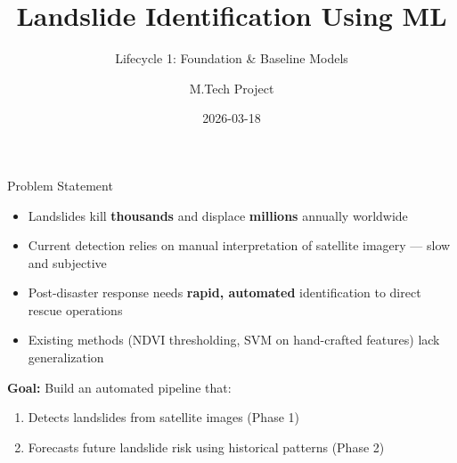 \documentclass[aspectratio=169]{beamer}
\title{Landslide Identification Using ML}
\subtitle{Lifecycle 1: Foundation \& Baseline Models}
\author{M.Tech Project}
\date{2026-03-18}
\begin{document}
\begin{frame}
    \titlepage
\end{frame}

\begin{frame}{Problem Statement}
    \begin{itemize}
        \item Landslides kill \textbf{thousands} and displace \textbf{millions} annually worldwide
        \item Current detection relies on manual interpretation of satellite imagery --- slow and subjective
        \item Post-disaster response needs \textbf{rapid, automated} identification to direct rescue operations
        \item Existing methods (NDVI thresholding, SVM on hand-crafted features) lack generalization
    \end{itemize}

    \vspace{0.5cm}
    \textbf{Goal:} Build an automated pipeline that:
    \begin{enumerate}
        \item Detects landslides from satellite images (Phase 1)
        \item Forecasts future landslide risk using historical patterns (Phase 2)
    \end{enumerate}
\end{frame}
\end{document}
